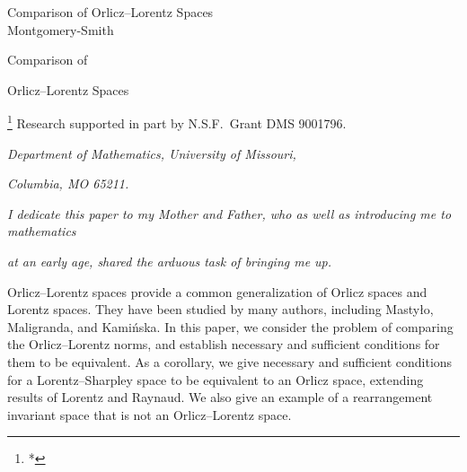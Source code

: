 \def\set#1{\{1$, $2,\ldots,$\ $#1\}}
\def\span#1{\overline{\hbox{\rm span}}\{#1\}}

\def\lnorm{\left\|}
\def\rnorm{\right\|}
\def\normo#1{\lnorm #1 \rnorm}
\def\widedot{\,\cdot\,}
\def\normdot{\normo{\widedot}}
\def\trinormo#1{\left|\left|\left| #1 \right|\right|\right|}
\def\trinormdot{\trinormo{\widedot}}

\def\lmod{\left|}
\def\rmod{\right|}
\def\modo#1{\lmod #1 \rmod}

\def\angleo#1{\left\langle #1 \right\rangle}

\def\dom#1{{\vert_{#1}}}

\def\implies{$\Rightarrow$}
\def\iff{$\Leftrightarrow$}


\def\Deltacond{$\Delta_2$-condition}
\def\phifunction{$\varphi$-function}
\def\Nfunction{{\it N}-function}
\def\conditionJ{condition~$(J)$}
\def\conditionL{condition~$(L)$}
\def\em{\mathop{\rm em}\nolimits}
\def\lm{\mathop{\rm lm}\nolimits}
\def\T{{\cal T}}


\noblankout
\finalversion

\setheadline Comparison of Orlicz--Lorentz Spaces\\
             Montgomery-Smith

{
\seventeenpoint
\centerline{\bigseventeenrm Comparison of }
\centerline{\bigseventeenrm Orlicz--Lorentz Spaces}
}
\bigskip\bigskip\medskip
\centerline{%
\footnote{*}%
{Research supported in part by N.S.F.\ Grant DMS 9001796.}%
}
\smallskip
{
\eightpoint
\centerline{\it Department of Mathematics, University of Missouri,}
\centerline{\it Columbia, MO 65211.}
}
\bigskip\bigskip

{
\eightpoint
\centerline{\it I dedicate this paper to my Mother and Father, who as well as
introducing me to mathematics}
\centerline{\it at an early age, shared the arduous task
of bringing me up.}
}
\bigskip\bigskip

\Abstract

Orlicz--Lorentz spaces provide a common generalization of Orlicz spaces and
Lorentz spaces. They have been studied by many authors, including
Masty\l o, Maligranda, and Kami\'nska. In this paper, we consider the
problem of comparing the Orlicz--Lorentz norms, and establish necessary and
sufficient conditions for them to be equivalent. As a corollary, we give
necessary and sufficient conditions for a Lorentz--Sharpley space to be
equivalent to an Orlicz space, extending results of Lorentz and Raynaud. We
also give an example of a rearrangement invariant space that is not an
Orlicz--Lorentz space.

